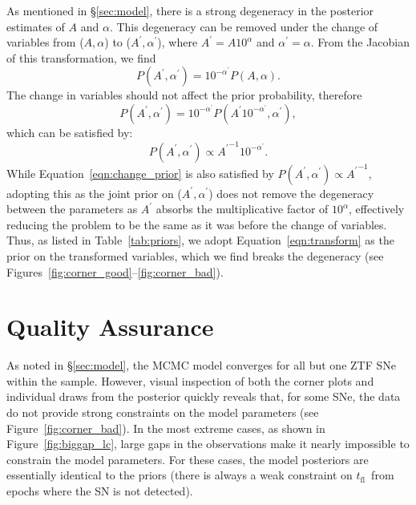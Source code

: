 \documentclass[twocolumn]{./aastex63}
\newcommand{\tfl}{$t_\mathrm{fl}$}
\begin{document}
As mentioned in \S\ref{sec:model}, there is a strong degeneracy in the
posterior estimates of $A$ and $\alpha$. This degeneracy can be removed under
the change of variables from ($A, \alpha$) to ($A^\prime, \alpha^\prime$),
where $A^\prime = A 10^\alpha$ and $\alpha^\prime = \alpha$. From the Jacobian
of this transformation, we find
$$P(A^\prime, \alpha^\prime) = 10^{-\alpha^\prime} P(A,\alpha).$$
The change in variables should not affect the prior probability, therefore
\begin{equation} 
    P(A^\prime, \alpha^\prime) = 10^{-\alpha^\prime} P(A^\prime
10^{-\alpha^\prime},\alpha^\prime), 
\label{eqn:change_prior} 
\end{equation}
which can be satisfied by:
\begin{equation}
    P(A^\prime, \alpha^\prime) \propto {A^\prime}^{-1} 10^{-\alpha^\prime}.
\label{eqn:transform}
\end{equation}
While Equation~\ref{eqn:change_prior} is also satisfied by $P(A^\prime,
\alpha^\prime) \propto {A^\prime}^{-1}$, adopting this as the joint prior on
($A^\prime, \alpha^\prime$) does not remove the degeneracy between the
parameters as $A^\prime$ absorbs the multiplicative factor of $10^\alpha$,
effectively reducing the problem to be the same as it was before the change of
variables. Thus, as listed in Table~\ref{tab:priors}, we adopt
Equation~\ref{eqn:transform} as the prior on the transformed variables, which
we find breaks the degeneracy (see
Figures~\ref{fig:corner_good}--\ref{fig:corner_bad}).

\section{Quality Assurance}\label{sec:qa}

As noted in \S\ref{sec:model}, the MCMC model converges for all but one ZTF
SNe within the sample. However, visual inspection of both the corner plots and
individual draws from the posterior quickly reveals that, for some SNe, the
data do not provide strong constraints on the model parameters (see
Figure~\ref{fig:corner_bad}). In the most extreme cases, as shown in
Figure~\ref{fig:biggap_lc}, large gaps in the observations make it nearly
impossible to constrain the model parameters. For these cases, the model
posteriors are essentially identical to the priors (there is always a weak
constraint on \tfl\ from epochs where the SN is not detected).
\end{document}
